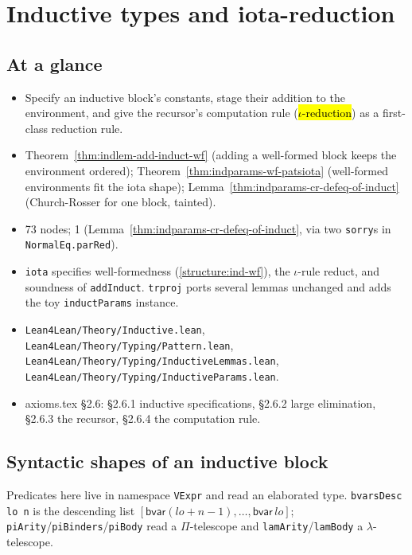 \chapter{Inductive types and iota-reduction}
\label{chap:inductive}

\section*{At a glance}
\begin{itemize}
\item {} Specify an inductive block's constants, stage their addition to the
environment, and give the recursor's computation rule (\hl{$\iota$-reduction}) as a
first-class reduction rule.
\item {} Theorem~\ref{thm:indlem-add-induct-wf} (adding a well-formed block
keeps the environment ordered); Theorem~\ref{thm:indparams-wf-patsiota} (well-formed
environments fit the iota shape); Lemma~\ref{thm:indparams-cr-defeq-of-induct} (Church-Rosser
for one block, tainted).
\item {} \stProved{} 73 nodes; \stTainted{} 1
(Lemma~\ref{thm:indparams-cr-defeq-of-induct}, via two \texttt{sorry}s in
\texttt{NormalEq.parRed}).
\item {} \texttt{iota} specifies well-formedness (\ref{structure:ind-wf}),
the $\iota$-rule reduct, and soundness of \texttt{addInduct}. \texttt{trproj} ports several
lemmas unchanged and adds the toy \texttt{inductParams} instance.
\item {} \texttt{Lean4Lean/Theory/Inductive.lean},
\texttt{Lean4Lean/Theory/Typing/Pattern.lean},
\texttt{Lean4Lean/Theory/Typing/InductiveLemmas.lean},
\texttt{Lean4Lean/Theory/Typing/InductiveParams.lean}.
\item {} axioms.tex \S2.6: \S2.6.1 inductive specifications, \S2.6.2 large
elimination, \S2.6.3 the recursor, \S2.6.4 the computation rule.
\end{itemize}

\section{Syntactic shapes of an inductive block}

Predicates here live in namespace \texttt{VExpr} and read an elaborated type.
\texttt{bvarsDesc lo n} is the descending list $[\mathsf{bvar}(lo+n-1),\ldots,\mathsf{bvar}\,lo]$;
\texttt{piArity}/\texttt{piBinders}/\texttt{piBody} read a $\Pi$-telescope and
\texttt{lamArity}/\texttt{lamBody} a $\lambda$-telescope.

